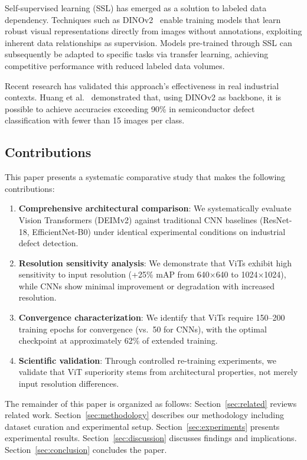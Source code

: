 \documentclass[journal,twoside,web]{ieeecolor}
\begin{document}
Self-supervised learning (SSL) has emerged as a solution to labeled data dependency. Techniques such as DINOv2~\cite{oquab2024dinov2} enable training models that learn robust visual representations directly from images without annotations, exploiting inherent data relationships as supervision. Models pre-trained through SSL can subsequently be adapted to specific tasks via transfer learning, achieving competitive performance with reduced labeled data volumes.

Recent research has validated this approach's effectiveness in real industrial contexts. Huang et al.~\cite{huang2025semiconductor} demonstrated that, using DINOv2 as backbone, it is possible to achieve accuracies exceeding 90\% in semiconductor defect classification with fewer than 15 images per class.

\subsection{Contributions}

This paper presents a systematic comparative study that makes the following contributions:

\begin{enumerate}
    \item \textbf{Comprehensive architectural comparison}: We systematically evaluate Vision Transformers (DEIMv2) against traditional CNN baselines (ResNet-18, EfficientNet-B0) under identical experimental conditions on industrial defect detection.
    
    \item \textbf{Resolution sensitivity analysis}: We demonstrate that ViTs exhibit high sensitivity to input resolution (+25\% mAP from 640$\times$640 to 1024$\times$1024), while CNNs show minimal improvement or degradation with increased resolution.
    
    \item \textbf{Convergence characterization}: We identify that ViTs require 150--200 training epochs for convergence (vs.\ 50 for CNNs), with the optimal checkpoint at approximately 62\% of extended training.
    
    \item \textbf{Scientific validation}: Through controlled re-training experiments, we validate that ViT superiority stems from architectural properties, not merely input resolution differences.
\end{enumerate}

The remainder of this paper is organized as follows: Section~\ref{sec:related} reviews related work. Section~\ref{sec:methodology} describes our methodology including dataset curation and experimental setup. Section~\ref{sec:experiments} presents experimental results. Section~\ref{sec:discussion} discusses findings and implications. Section~\ref{sec:conclusion} concludes the paper.
\end{document}
